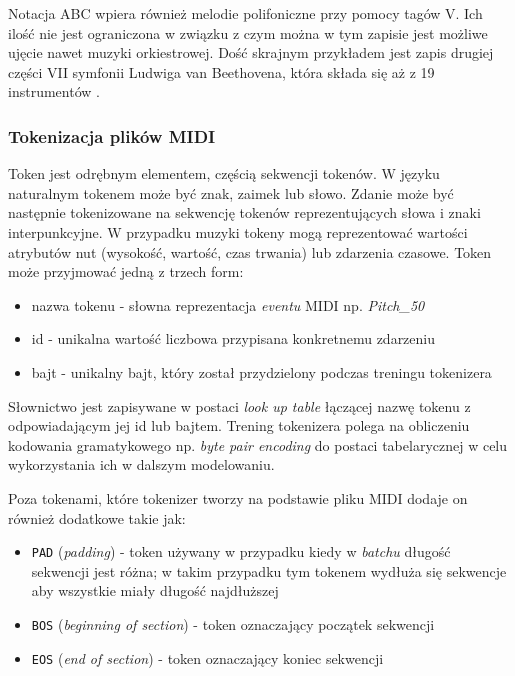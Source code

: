 \documentclass[data-science]{agh-wi} %
\begin{document}
Notacja ABC wpiera również melodie polifoniczne przy pomocy tagów V. Ich ilość nie jest ograniczona w związku z czym można w tym zapisie jest możliwe ujęcie nawet muzyki orkiestrowej. Dość skrajnym przykładem jest zapis drugiej części VII symfonii Ludwiga van Beethovena, która składa się aż z 19 instrumentów \cite{beethoven}.

\subsubsection*{Tokenizacja plików MIDI}\label{sec:REMI}
Token jest odrębnym elementem, częścią sekwencji tokenów. W języku naturalnym tokenem może być znak, zaimek lub słowo. Zdanie może być następnie tokenizowane na sekwencję tokenów reprezentujących słowa i znaki interpunkcyjne. W przypadku muzyki tokeny mogą reprezentować wartości atrybutów nut (wysokość, wartość, czas trwania) lub zdarzenia czasowe. Token może przyjmować jedną z trzech form:
\begin{itemize}
    \item nazwa tokenu - słowna reprezentacja \textit{eventu} MIDI np. \textit{Pitch\_50}
    \item id - unikalna wartość liczbowa przypisana konkretnemu zdarzeniu
    \item bajt - unikalny bajt, który został przydzielony podczas treningu tokenizera
\end{itemize}

Słownictwo jest zapisywane w postaci \textit{look up table} łączącej nazwę tokenu z odpowiadającym jej id lub bajtem. Trening tokenizera polega na obliczeniu kodowania gramatykowego np. \textit{byte pair encoding} do postaci tabelarycznej w celu wykorzystania ich w dalszym modelowaniu.

Poza tokenami, które tokenizer tworzy na podstawie pliku MIDI dodaje on również dodatkowe takie jak:
\begin{itemize}
    \item \texttt{PAD} (\textit{padding}) - token używany w przypadku kiedy w \textit{batchu} długość sekwencji jest różna; w takim przypadku tym tokenem wydłuża się sekwencje aby wszystkie miały długość najdłuższej
    \item \texttt{BOS} (\textit{beginning of section}) - token oznaczający początek sekwencji
    \item \texttt{EOS} (\textit{end of section}) - token oznaczający koniec sekwencji
\end{itemize}
\end{document}
